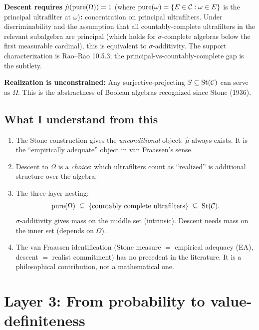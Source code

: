 \textbf{Descent requires $\hat{\mu}(\mathrm{pure}(\Omega)) = 1$}
(where $\mathrm{pure}(\omega) = \{E \in \mathcal{C} : \omega \in E\}$ is
the principal ultrafilter at $\omega$)\textbf{:} concentration on
principal ultrafilters.  Under discriminability
and the assumption that all countably-complete ultrafilters in the
relevant subalgebra are principal (which holds for $\sigma$-complete
algebras below the first measurable cardinal), this is equivalent
to $\sigma$-additivity.  The support characterization is Rao--Rao
10.5.3; the principal-vs-countably-complete gap is the subtlety.

\textbf{Realization is unconstrained:} Any surjective-projecting
$S \subseteq \mathrm{St}(\mathcal{C})$ can serve as $\Omega$.  This is
the abstractness of Boolean algebras recognized since Stone (1936).

\subsection{What I understand from this}

\begin{enumerate}
  \item The Stone construction gives the \emph{unconditional}
    object: $\hat{\mu}$ always exists.  It is the ``empirically
    adequate'' object in van Fraassen's sense.

  \item Descent to $\Omega$ is a \emph{choice}: which ultrafilters
    count as ``realized'' is additional structure over the algebra.

  \item The three-layer nesting:
    \[
      \mathrm{pure}(\Omega) \;\subseteq\;
      \{\text{countably complete ultrafilters}\} \;\subseteq\;
      \mathrm{St}(\mathcal{C}).
    \]
    $\sigma$-additivity gives mass on the middle set (intrinsic).
    Descent needs mass on the inner set (depends on $\Omega$).

  \item The van Fraassen identification (Stone measure $=$
    empirical adequacy (EA), descent $=$ realist commitment)
    has no precedent in the literature.  It is a philosophical
    contribution, not a mathematical one.
\end{enumerate}

\section{Layer 3: From probability to value-definiteness}
\label{sec:vdr}

